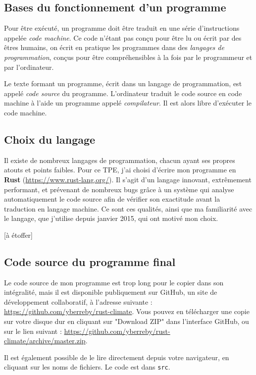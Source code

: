 \documentclass[12pt]{article}
\begin{document}
\subsection{Bases du fonctionnement d'un programme}

Pour être exécuté, un programme doit être traduit en une série d'instructions appelée \emph{code machine}. Ce code n'étant pas conçu pour être lu ou écrit par des êtres humains, on écrit en pratique les programmes dans des \emph{langages de programmation}, conçus pour être compréhensibles à la fois par le programmeur et par l'ordinateur.

Le texte formant un programme, écrit dans un langage de programmation, est appelé \emph{code source} du programme. L'ordinateur traduit le code source en code machine à l'aide un programme appelé \emph{compilateur}. Il est alors libre d'exécuter le code machine.

\subsection{Choix du langage}
Il existe de nombreux langages de programmation, chacun ayant ses propres atouts et points faibles. Pour ce TPE, j'ai choisi d'écrire mon programme en \textbf{Rust} (\url{https://www.rust-lang.org/}). Il s'agit d'un langage innovant, extrêmement performant, et prévenant de nombreux bugs grâce à un système qui analyse automatiquement le code source afin de vérifier son exactitude avant la traduction en langage machine. Ce sont ces qualités, ainsi que ma familiarité avec le langage, que j'utilise depuis janvier 2015, qui ont motivé mon choix.

[à étoffer]

\subsection{Code source du programme final}
Le code source de mon programme est trop long pour le copier dans son intégralité, mais il est disponible publiquement sur GitHub, un site de développement collaboratif, à l'adresse suivante : \url{https://github.com/yberreby/rust-climate}. Vous pouvez en télécharger une copie sur votre disque dur en cliquant sur "Download ZIP" dans l'interface GitHub, ou sur le lien suivant : \url{https://github.com/yberreby/rust-climate/archive/master.zip}.

Il est également possible de le lire directement depuis votre navigateur, en cliquant sur les noms de fichiers. Le code est dans \texttt{src}.
\end{document}
